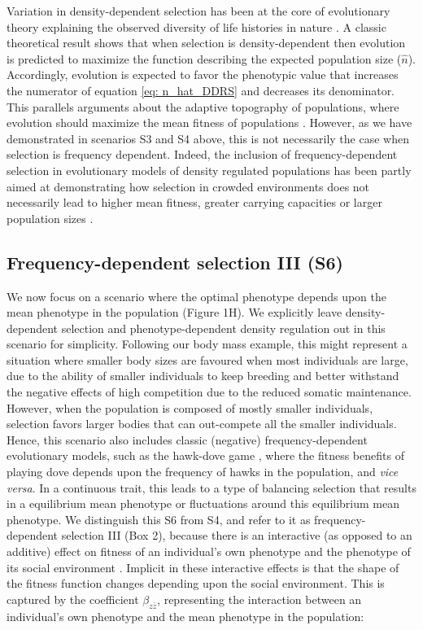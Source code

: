 \documentclass{article}
\begin{document}
Variation in density-dependent selection has been at the core of evolutionary theory explaining the observed diversity of life histories in nature \citep{Pianka1970,macarthur1967theory, Boyce1984, Mueller1991, Engen2013}. A classic theoretical result \citep{MacArthur1962, Engen2013} shows that when selection is density-dependent then evolution is predicted to maximize the function describing the expected population size ($\hat{n}$). Accordingly, evolution is expected to favor the phenotypic value that increases the numerator of equation \ref{eq: n_hat_DDRS} and decreases its denominator. This parallels arguments about the adaptive topography of populations, where evolution should maximize the mean fitness of populations \citep{Wright1931}. However, as we have demonstrated in scenarios S3 and S4 above, this is not necessarily the case when selection is frequency dependent. Indeed, the inclusion of frequency-dependent selection in evolutionary models of density regulated populations has been partly aimed at demonstrating how selection in crowded environments does not necessarily lead to higher mean fitness, greater carrying capacities or larger population sizes \citep{Clarke1972, Anderson1983, Engen2020}. 

\subsection{Frequency-dependent selection III (S6)}
We now focus on a scenario where the optimal phenotype depends upon the mean phenotype in the population (Figure 1H). We explicitly leave density-dependent selection and phenotype-dependent density regulation out in this scenario for simplicity. Following our body mass example, this might represent a situation where smaller body sizes are favoured when most individuals are large, due to the ability of smaller individuals to keep breeding and better withstand the negative effects of high competition due to the reduced somatic maintenance. However, when the population is composed of mostly smaller individuals, selection favors larger bodies that can out-compete all the smaller individuals. Hence, this scenario also includes classic (negative) frequency-dependent evolutionary models, such as the hawk-dove game \citep{MaynardSmith1982}, where the fitness benefits of playing dove depends upon the frequency of hawks in the population, and \textit{vice versa}. In a continuous trait, this leads to a type of balancing selection that results in a equilibrium mean phenotype or fluctuations around this equilibrium mean phenotype. We distinguish this S6 from S4, and refer to it as frequency-dependent selection III (Box 2), because there is an interactive (as opposed to an additive) effect on fitness of an individual's own phenotype and the phenotype of its social environment \citep{Araya-Ajoy2020}. Implicit in these interactive effects is that the shape of the fitness function changes depending upon the social environment. This is captured by the coefficient $\beta_{z\bar{z}}$, representing the interaction between an individual's own phenotype and the mean phenotype in the population:  
\end{document}
